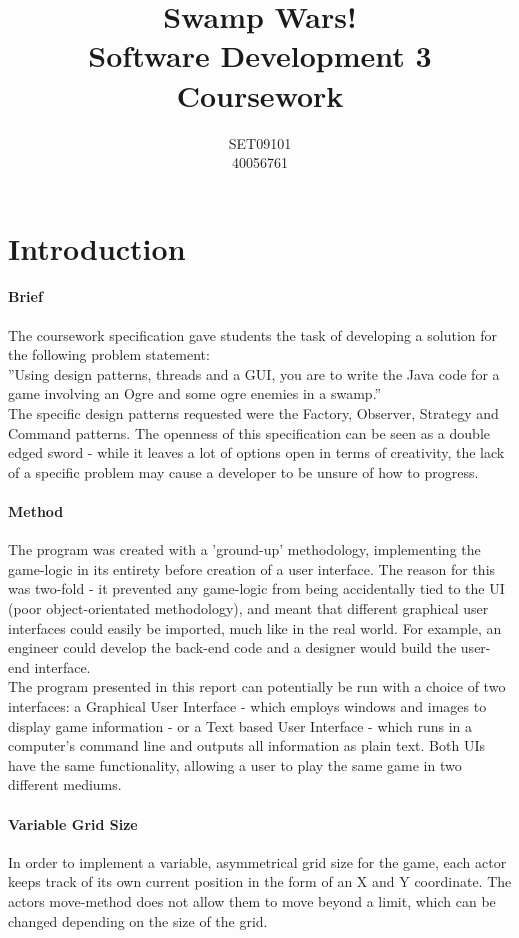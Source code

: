 \documentclass[conference]{acmsiggraph}
\title{Swamp Wars!\\Software Development 3\\Coursework}
\author{SET09101\\40056761}
\begin{document}
\fancyfoot{\thepage}
	\maketitle	
	\section{Introduction}
	
		\paragraph{Brief}
			The coursework specification gave students the task of developing a solution for the following problem statement:\\
			”Using design patterns, threads and a GUI, you are to write the Java code for a game involving an Ogre and some ogre enemies in a swamp.”\\
			The specific design patterns requested were the Factory, Observer, Strategy and Command patterns.
			The openness of this specification can be seen as a double edged sword - while it leaves a lot of options open in terms of creativity, the lack of a specific problem may cause a developer to be unsure of how to progress.
			
		
		\paragraph{Method}
			The program was created with a ’ground-up’ methodology, implementing the game-logic in its entirety before creation of a user interface. The reason for this was two-fold - it prevented any game-logic from being accidentally tied to the UI (poor object-orientated methodology), and meant that different graphical user interfaces could easily be imported, much like in the real world. For example, an engineer could develop the back-end code and a designer would build the user-end interface.\\
			The program presented in this report can potentially be run with a choice of two interfaces: a Graphical User Interface - which employs windows and images to display game information - or a Text based User Interface - which runs in a computer’s command line and outputs all information as plain text. Both UIs have the same functionality, allowing a user to play the same game in two different mediums.
		  
		
		\paragraph{Variable Grid Size}
			In order to implement a variable, asymmetrical grid size for the game, each actor keeps track of its own current position in the form of an X and Y coordinate. The actors move-method does not allow them to move beyond a limit, which can be changed depending on the size of the grid.
				
\end{document}
